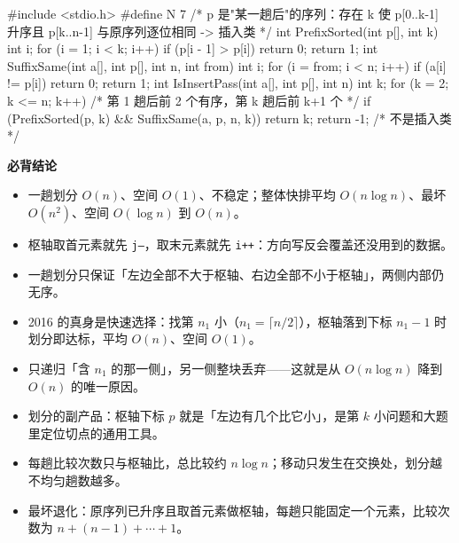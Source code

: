 \documentclass[10pt,a4paper]{ctexart}
\begin{document}
\begin{codebox}
#include <stdio.h>
#define N 7
/* p 是"某一趟后"的序列：存在 k 使 p[0..k-1] 升序且 p[k..n-1] 与原序列逐位相同 -> 插入类 */
int PrefixSorted(int p[], int k) {
    int i;
    for (i = 1; i < k; i++) if (p[i - 1] > p[i]) return 0;
    return 1;
}
int SuffixSame(int a[], int p[], int n, int from) {
    int i;
    for (i = from; i < n; i++) if (a[i] != p[i]) return 0;
    return 1;
}
int IsInsertPass(int a[], int p[], int n) {
    int k;
    for (k = 2; k <= n; k++)                /* 第 1 趟后前 2 个有序，第 k 趟后前 k+1 个 */
        if (PrefixSorted(p, k) && SuffixSame(a, p, n, k)) return k;
    return -1;                              /* 不是插入类 */
}
\end{codebox}




\textbf{必背结论}

\begin{itemize}

\item 一趟划分 $O(n)$、空间 $O(1)$、不稳定；整体快排平均 $O(n\log n)$、最坏 $O(n^2)$、空间 $O(\log n)$ 到 $O(n)$。

\item 枢轴取首元素就先 \texttt{j--}，取末元素就先 \texttt{i++}：方向写反会覆盖还没用到的数据。

\item 一趟划分只保证「左边全部不大于枢轴、右边全部不小于枢轴」，两侧内部仍无序。

\item 2016 的真身是快速选择：找第 $n_1$ 小（$n_1=\lceil n/2\rceil$），枢轴落到下标 $n_1-1$ 时划分即达标，平均 $O(n)$、空间 $O(1)$。

\item 只递归「含 $n_1$ 的那一侧」，另一侧整块丢弃——这就是从 $O(n\log n)$ 降到 $O(n)$ 的唯一原因。

\item 划分的副产品：枢轴下标 $p$ 就是「左边有几个比它小」，是第 $k$ 小问题和大题里定位切点的通用工具。

\item 每趟比较次数只与枢轴比，总比较约 $n\log n$；移动只发生在交换处，划分越不均匀趟数越多。

\item 最坏退化：原序列已升序且取首元素做枢轴，每趟只能固定一个元素，比较次数为 $n+(n-1)+\cdots+1$。

\end{itemize}
\end{document}
